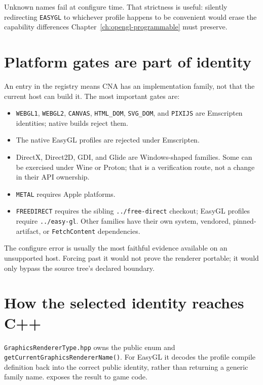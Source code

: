 Unknown names fail at configure time. That strictness is useful: silently redirecting
\texttt{EASYGL} to whichever profile happens to be convenient would erase the capability
differences Chapter~\ref{ch:opengl-programmable} must preserve.

\section{Platform gates are part of identity}

An entry in the registry means CNA has an implementation family, not that the current host can
build it. The most important gates are:

\begin{itemize}
  \item \texttt{WEBGL1}, \texttt{WEBGL2}, \texttt{CANVAS}, \texttt{HTML\_DOM},
    \texttt{SVG\_DOM}, and \texttt{PIXIJS} are Emscripten identities; native builds reject them.
  \item The native EasyGL profiles are rejected under Emscripten.
  \item DirectX, Direct2D, GDI, and Glide are Windows-shaped families. Some can be exercised under
    Wine or Proton; that is a verification route, not a change in their API ownership.
  \item \texttt{METAL} requires Apple platforms.
  \item \texttt{FREEDIRECT} requires the sibling \texttt{../free-direct} checkout; EasyGL profiles
    require \texttt{../easy-gl}. Other families have their own system, vendored, pinned-artifact,
    or \texttt{FetchContent} dependencies.
\end{itemize}

The configure error is usually the most faithful evidence available on an unsupported host.
Forcing past it would not prove the renderer portable; it would only bypass the source tree's
declared boundary.

\section{How the selected identity reaches C++}

\texttt{GraphicsRendererType.hpp} owns the public enum and
\texttt{getCurrentGraphicsRendererName()}. For EasyGL it decodes the profile compile definition
back into the correct public identity, rather than returning a generic family name.
 exposes the result to game code.

